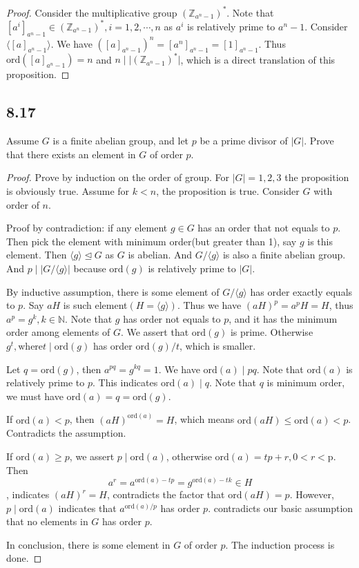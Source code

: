 \documentclass[a4paper, pdf, 12pt]{article}
\begin{document}
\begin{proof}
  Consider the multiplicative group $(\mathbb{Z}_{a^{n} - 1})^{*}$. Note that $[a^{i}]_{a^{n}-1}\in (\mathbb{Z}_{a^{n}-1})^{*}, i = 1,2,\cdots, n$
  as $a^{i}$ is relatively prime to $a^{n}-1$. Consider $\langle [a]_{a^{n}-1}\rangle$. We have $([a]_{a^{n}-1})^{n} = [a^{n}]_{a^{n}-1} = [1]_{a^{n} - 1}$. Thus
  $\mbox{ord}([a]_{a^{n}-1}) = n$ and $n\mid \lvert (\mathbb{Z}_{a^{n}-1})^{*} \rvert$, which is a direct translation of this 
  proposition.
\end{proof}

\subsection*{8.17}
Assume $G$ is a finite abelian group, and let $p$ be a prime divisor of $\lvert G\rvert$.
Prove that there exists an element in $G$ of order $p$.

\begin{proof}
  Prove by induction on the order of group. For $\lvert G\lvert = 1,2,3$ the proposition is 
  obviously true. Assume for $k < n$, the proposition is true. Consider $G$ with order of $n$. 

  Proof by contradiction: if any element $g\in G$ has an order that not equals to $p$. Then pick the element 
  with minimum order(but greater than 1), say $g$ is this element. Then $\langle g \rangle\trianglelefteq G$ as $G$
  is abelian. And $G/\langle g\rangle$ is also a finite abelian group. And $p \mid \lvert G/\langle g \rangle \rvert$
  because $\mbox{ord}(g)$ is relatively prime to $\lvert G \rvert$. 

  By inductive assumption, there is some element of $G/\langle g\rangle$ has order exactly equals to $p$. Say $aH$ is such 
  element$(H = \langle g \rangle)$. Thus we have $(aH)^{p} = a^{p}H = H$, thus $a^{p} = g^{k}, k\in \mathbb{N}$.
  Note that $g$ has order not equals to $p$, and it has the minimum order among elements of $G$. We assert that $\mbox{ord}(g)$ is prime. 
  Otherwise $g^{t}, \mbox{where} t\mid \mbox{ord}(g)$ has order $\mbox{ord}(g) / t$, which is smaller. 

  Let $q = \mbox{ord}(g)$, then $a^{pq} = g^{kq} = 1$. We have $\mbox{ord}(a)\mid pq$. Note that $\mbox{ord}(a)$ is relatively prime to $p$. 
  This indicates $\mbox{ord}(a)\mid q$. Note that $q$ is minimum order, we must have $\mbox{ord}(a) = q = \mbox{ord}(g)$.

  If $\mbox{ord}(a) < p$, then $(aH)^{\mbox{ord}(a)} = H$, which means $\mbox{ord}(aH) \leq \mbox{ord}(a) < p$. Contradicts the assumption. 

  If $\mbox{ord}(a) \geq p$, we assert $p\mid \mbox{ord}(a)$, otherwise $\mbox{ord}(a) = tp + r, 0 < r < \mbox{p}$. Then 
  $$
  a^{r} = a^{\mbox{ord}(a) - tp} = g^{\mbox{ord}(a) - tk} \in H
  $$, indicates $(aH)^{r} = H$, contradicts the factor that $\mbox{ord}(aH) = p$. However, $p\mid \mbox{ord}(a)$ indicates that 
  $a^{\mbox{ord}(a)/p}$ has order $p$. contradicts our basic assumption that no elements in $G$ has order $p$.

  In conclusion, there is some element in $G$ of order $p$. The induction process is done.
\end{proof}
\end{document}
